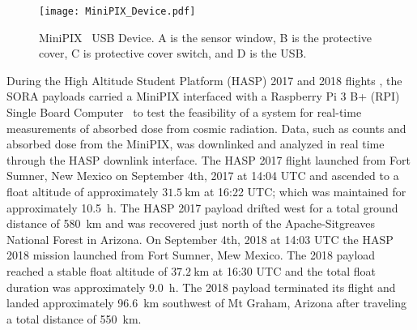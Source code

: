 \begin{figure}[H] %
    \centering
    \texttt{[image: MiniPIX\_Device.pdf]} 
    \caption{MiniPIX~\cite{advacam} USB Device. A is the sensor window, B is the protective cover, C is protective cover switch, and D is the USB.}
    \label{fig:minipix_usb}
\end{figure}

During the High Altitude Student Platform (HASP) 2017 and 2018 flights \cite{hasp}, the SORA payloads carried a MiniPIX interfaced with a Raspberry Pi 3 B+ (RPI) Single Board Computer~\cite{rpi} to test the feasibility of a system for real-time measurements of absorbed dose from cosmic radiation. Data, such as counts and absorbed dose from the MiniPIX, was downlinked and analyzed in real time through the HASP downlink interface. The HASP 2017 flight launched from Fort Sumner, New Mexico on September 4th, 2017 at 14:04 UTC and ascended to a float altitude of approximately $\SI{31.5}{\kilo\meter}$ at 16:22 UTC; which was maintained for approximately \SI{10.5}{\hour}. The HASP 2017 payload drifted west for a total ground distance of \SI{580}{\kilo\meter} and was recovered just north of the Apache-Sitgreaves National Forest in Arizona.  On September 4th, 2018 at 14:03 UTC the HASP 2018 mission launched from Fort Sumner, Mew Mexico.  The 2018 payload reached a stable float altitude of $\SI{37.2}{\kilo\meter}$ at 16:30 UTC and the total float duration was approximately \SI{9.0}{\hour}. The 2018 payload terminated its flight and landed approximately \SI{96.6}{\kilo\meter} southwest of Mt Graham, Arizona after traveling a total distance of \SI{550}{\kilo\meter}.

